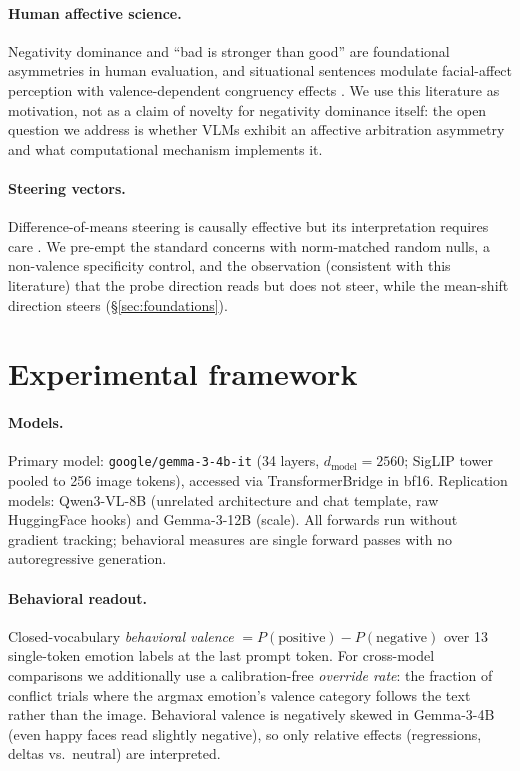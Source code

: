 \documentclass{article}
\newcommand{\gemma}{Gemma-3-4B}
\newcommand{\gemmabig}{Gemma-3-12B}
\newcommand{\qwen}{Qwen3-VL-8B}
\begin{document}
\paragraph{Human affective science.}
Negativity dominance \citep{rozin2001} and ``bad is stronger than good'' \citep{baumeister2001} are foundational asymmetries in human evaluation, and situational sentences modulate facial-affect perception with valence-dependent congruency effects \citep{aviezer2008, aviezer2012}. We use this literature as motivation, not as a claim of novelty for negativity dominance itself: the open question we address is whether VLMs exhibit an affective arbitration asymmetry and what computational mechanism implements it.

\paragraph{Steering vectors.}
Difference-of-means steering is causally effective but its interpretation requires care \citep{steeringunreliability2025, steeringnonident2026}. We pre-empt the standard concerns with norm-matched random nulls, a non-valence specificity control, and the observation (consistent with this literature) that the probe direction reads but does not steer, while the mean-shift direction steers (\S\ref{sec:foundations}).

\section{Experimental framework}
\label{sec:setup}

\paragraph{Models.}
Primary model: \texttt{google/gemma-3-4b-it} (34 layers, $d_{\text{model}}{=}2560$; SigLIP tower pooled to 256 image tokens), accessed via TransformerBridge in bf16. Replication models: \qwen{} (unrelated architecture and chat template, raw HuggingFace hooks) and \gemmabig{} (scale). All forwards run without gradient tracking; behavioral measures are single forward passes with no autoregressive generation.

\paragraph{Behavioral readout.}
Closed-vocabulary \emph{behavioral valence} $= P(\text{positive}) - P(\text{negative})$ over 13 single-token emotion labels at the last prompt token. For cross-model comparisons we additionally use a calibration-free \emph{override rate}: the fraction of conflict trials where the argmax emotion's valence category follows the text rather than the image. Behavioral valence is negatively skewed in \gemma{} (even happy faces read slightly negative), so only relative effects (regressions, deltas vs.\ neutral) are interpreted.
\end{document}
